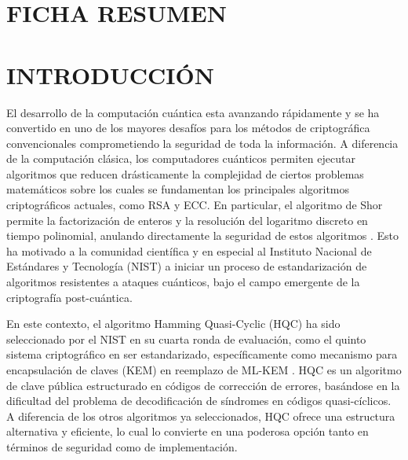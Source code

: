 \pagestyle{plain} %
\setcounter{page}{1}




\chapter*{FICHA RESUMEN}


\chapter*{INTRODUCCIÓN}

El desarrollo de la computación cuántica esta avanzando rápidamente y se ha convertido en uno de los mayores desafíos para los métodos de criptográfica convencionales comprometiendo la seguridad de toda la información. A diferencia de la computación clásica, los computadores cuánticos permiten ejecutar algoritmos que reducen drásticamente la complejidad de ciertos problemas matemáticos sobre los cuales se fundamentan los principales algoritmos criptográficos actuales, como RSA y ECC. En particular, el algoritmo de Shor permite la factorización de enteros y la resolución del logaritmo discreto en tiempo polinomial, anulando directamente la seguridad de estos algoritmos \cite{GidneyEkerå2021}. Esto ha motivado a la comunidad científica y en especial al Instituto Nacional de Estándares y Tecnología (NIST) a iniciar un proceso de estandarización de algoritmos resistentes a ataques cuánticos, bajo el campo emergente de la criptografía post-cuántica.

En este contexto, el algoritmo Hamming Quasi-Cyclic (HQC) ha sido seleccionado por el NIST en su cuarta ronda de evaluación, como el quinto sistema criptográfico en ser estandarizado, específicamente como mecanismo para encapsulación de claves (KEM) en reemplazo de ML-KEM \cite{NISTIR8545_2025}. HQC es un algoritmo de clave pública estructurado en códigos de corrección de errores, basándose en la dificultad del problema de decodificación de síndromes en códigos quasi-cíclicos. A diferencia de los otros algoritmos ya seleccionados, HQC ofrece una estructura alternativa y eficiente, lo cual lo convierte en una poderosa opción tanto en términos de seguridad como de implementación.

